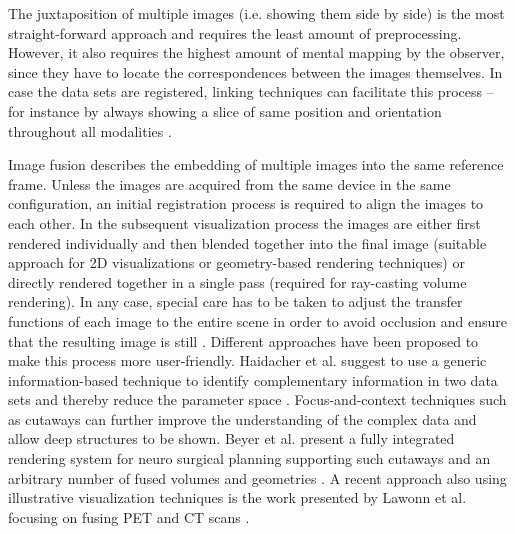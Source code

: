 The juxtaposition of multiple images (i.e. showing them side by side) is the most straight-forward approach and requires the least amount of preprocessing. 
However, it also requires the highest amount of mental mapping by the observer, since they have to locate the correspondences between the images themselves.
In case the data sets are registered, linking techniques can facilitate this process -- for instance by always showing a slice of same position and orientation throughout all modalities \II.

Image fusion describes the embedding of multiple images into the same reference frame.
Unless the images are acquired from the same device in the same configuration, an initial registration process is required to align the images to each other.
In the subsequent visualization process the images are either first rendered individually and then blended together into the final image (suitable approach for 2D visualizations or geometry-based rendering techniques) or directly rendered together in a single pass (required for ray-casting volume rendering).
In any case, special care has to be taken to  adjust the transfer functions of each image to  the entire scene in order to avoid occlusion and ensure that the resulting image is still .
Different approaches have been proposed to make this process more user-friendly.
Haidacher et al. suggest to use a generic information-based technique to identify complementary information in two data sets and thereby reduce the parameter space \cite{Haidacher:2008:MultimodalVis}.
Focus-and-context techniques such as cutaways can further improve the understanding of the complex data and allow deep structures to be shown.
Beyer et al. present a fully integrated rendering system for neuro surgical planning supporting such cutaways and an arbitrary number of fused volumes and geometries \cite{Beyer:2007:MultimodalRendering}.
A recent approach also using illustrative visualization techniques is the work presented by Lawonn et al. focusing on fusing PET and CT scans \cite{Lawonn:2015:IlusstrativePetCt}.
